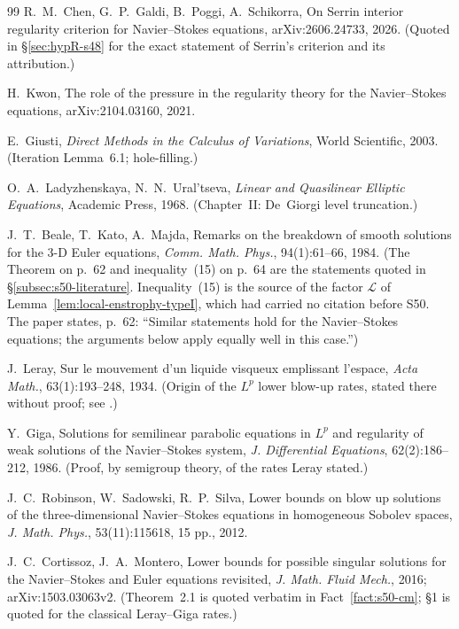 \documentclass[11pt]{article}
\theoremstyle{definition}
\theoremstyle{remark}
\begin{document}
\begin{thebibliography}{99}
  R.~M.~Chen, G.~P.~Galdi, B.~Poggi, A.~Schikorra,
  On Serrin interior regularity criterion for Navier--Stokes equations,
  arXiv:2606.24733, 2026. (Quoted in \S\ref{sec:hypR-s48} for the exact
  statement of Serrin's criterion and its attribution.)

  H.~Kwon,
  The role of the pressure in the regularity theory for the Navier--Stokes
  equations,
  arXiv:2104.03160, 2021.

  E.~Giusti,
  \emph{Direct Methods in the Calculus of Variations},
  World Scientific, 2003. (Iteration Lemma~6.1; hole-filling.)

  O.~A.~Ladyzhenskaya, N.~N.~Ural'tseva,
  \emph{Linear and Quasilinear Elliptic Equations},
  Academic Press, 1968. (Chapter~II: De~Giorgi level truncation.)


  J.~T.~Beale, T.~Kato, A.~Majda,
  Remarks on the breakdown of smooth solutions for the 3-D Euler equations,
  \emph{Comm. Math. Phys.}, 94(1):61--66, 1984.
  (The Theorem on p.~62 and inequality~(15) on p.~64 are the statements
  quoted in \S\ref{subsec:s50-literature}. Inequality~(15) is the source of
  the factor $\mathcal{L}$ of Lemma~\ref{lem:local-enstrophy-typeI}, which
  had carried no citation before S50. The paper states, p.~62: ``Similar
  statements hold for the Navier--Stokes equations; the arguments below
  apply equally well in this case.'')

  J.~Leray,
  Sur le mouvement d'un liquide visqueux emplissant l'espace,
  \emph{Acta Math.}, 63(1):193--248, 1934.
  (Origin of the $L^p$ lower blow-up rates, stated there without proof; see
  \cite[\S1]{CortissozMontero2016}.)

  Y.~Giga,
  Solutions for semilinear parabolic equations in $L^p$ and regularity of
  weak solutions of the Navier--Stokes system,
  \emph{J. Differential Equations}, 62(2):186--212, 1986.
  (Proof, by semigroup theory, of the rates Leray stated.)

  J.~C.~Robinson, W.~Sadowski, R.~P.~Silva,
  Lower bounds on blow up solutions of the three-dimensional Navier--Stokes
  equations in homogeneous Sobolev spaces,
  \emph{J. Math. Phys.}, 53(11):115618, 15 pp., 2012.

  J.~C.~Cortissoz, J.~A.~Montero,
  Lower bounds for possible singular solutions for the Navier--Stokes and
  Euler equations revisited,
  \emph{J. Math. Fluid Mech.}, 2016; arXiv:1503.03063v2.
  (Theorem~2.1 is quoted verbatim in Fact~\ref{fact:s50-cm}; \S1 is quoted
  for the classical Leray--Giga rates.)


\end{thebibliography}
\end{document}

